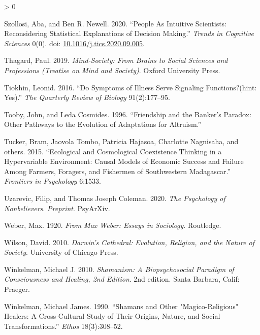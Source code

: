 \documentclass[
  11pt,
]{article}
\newlength{\cslhangindent}
\newenvironment{CSLReferences}[2] %
 {%
  \setlength{\parindent}{0pt}
  \ifodd #1 \everypar{\setlength{\hangindent}{\cslhangindent}}\ignorespaces\fi
  \ifnum #2 > 0
  \setlength{\parskip}{#2\baselineskip}
  \fi
 }%
 {}
\begin{document}
\begin{CSLReferences}{1}{0}
\leavevmode\hypertarget{ref-szollosiPeopleIntuitiveScientists2020}{}%
Szollosi, Aba, and Ben R. Newell. 2020. {``People {As Intuitive Scientists}: {Reconsidering Statistical Explanations} of {Decision Making}.''} \emph{Trends in Cognitive Sciences} 0(0). doi: \href{https://doi.org/10.1016/j.tics.2020.09.005}{10.1016/j.tics.2020.09.005}.

\leavevmode\hypertarget{ref-thagardMindSocietyBrainsSocial2019}{}%
Thagard, Paul. 2019. \emph{Mind-{Society}: {From Brains} to {Social Sciences} and {Professions} ({Treatise} on {Mind} and {Society})}. {Oxford University Press}.

\leavevmode\hypertarget{ref-tiokhin2016symptoms}{}%
Tiokhin, Leonid. 2016. {``Do Symptoms of Illness Serve Signaling Functions?(hint: Yes).''} \emph{The Quarterly Review of Biology} 91(2):177--95.

\leavevmode\hypertarget{ref-toobyFriendshipBankerParadox1996a}{}%
Tooby, John, and Leda Cosmides. 1996. {``Friendship and the {Banker}'s {Paradox}: {Other Pathways} to the {Evolution} of {Adaptations} for {Altruism}.''}

\leavevmode\hypertarget{ref-tucker2015ecological}{}%
Tucker, Bram, Jaovola Tombo, Patricia Hajasoa, Charlotte Nagnisaha, and others. 2015. {``Ecological and Cosmological Coexistence Thinking in a Hypervariable Environment: Causal Models of Economic Success and Failure Among Farmers, Foragers, and Fishermen of Southwestern {Madagascar}.''} \emph{Frontiers in Psychology} 6:1533.

\leavevmode\hypertarget{ref-uzarevicPsychologyNonbelievers2020}{}%
Uzarevic, Filip, and Thomas Joseph Coleman. 2020. \emph{The {Psychology} of {Nonbelievers}}. \emph{Preprint}. {PsyArXiv}.

\leavevmode\hypertarget{ref-weber2009max}{}%
Weber, Max. 1920. \emph{From Max Weber: Essays in Sociology}. {Routledge}.

\leavevmode\hypertarget{ref-wilson2010darwin}{}%
Wilson, David. 2010. \emph{Darwin's Cathedral: {Evolution}, Religion, and the Nature of Society}. {University of Chicago Press}.

\leavevmode\hypertarget{ref-winkelmanShamanismBiopsychosocialParadigm2010}{}%
Winkelman, Michael J. 2010. \emph{Shamanism: {A Biopsychosocial Paradigm} of {Consciousness} and {Healing}, 2nd {Edition}}. 2nd edition. {Santa Barbara, Calif}: {Praeger}.

\leavevmode\hypertarget{ref-winkelmanShamansOtherMagicoReligious1990}{}%
Winkelman, Michael James. 1990. {``Shamans and {Other} "{Magico}-{Religious}" {Healers}: {A Cross}-{Cultural Study} of {Their Origins}, {Nature}, and {Social Transformations}.''} \emph{Ethos} 18(3):308--52.


\end{CSLReferences}
\end{document}
